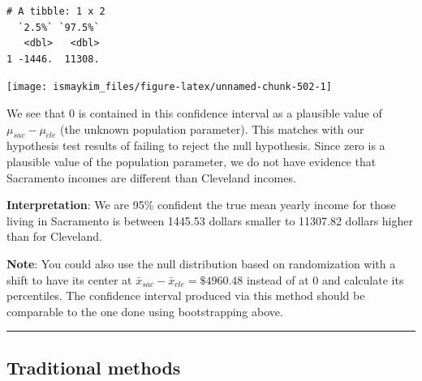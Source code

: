 \documentclass[12pt,]{krantz}
\makeatletter
\newenvironment{Shaded}{\begin{snugshade}}{\end{snugshade}}
\newcommand{\KeywordTok}[1]{\textcolor[rgb]{0.27,0.27,0.27}{\textbf{#1}}}
\newcommand{\DataTypeTok}[1]{\textcolor[rgb]{0.27,0.27,0.27}{#1}}
\newcommand{\StringTok}[1]{\textcolor[rgb]{0.5,0.5,0.5}{#1}}
\newcommand{\OperatorTok}[1]{\textcolor[rgb]{0.43,0.43,0.43}{\textbf{#1}}}
\newcommand{\NormalTok}[1]{#1}
\newenvironment{kframe}{%
\medskip{}
\setlength{\fboxsep}{.8em}
 \def\at@end@of@kframe{}%
 \ifinner\ifhmode%
  \def\at@end@of@kframe{\end{minipage}}%
  \begin{minipage}{\columnwidth}%
 \fi\fi%
 \def\FrameCommand##1{\hskip\@totalleftmargin \hskip-\fboxsep
 \colorbox{shadecolor}{##1}\hskip-\fboxsep
     \hskip-\linewidth \hskip-\@totalleftmargin \hskip\columnwidth}%
 \MakeFramed {\advance\hsize-\width
   \@totalleftmargin\z@ \linewidth\hsize
   \@setminipage}}%
 {\par\unskip\endMakeFramed%
 \at@end@of@kframe}
\renewenvironment{Shaded}{\begin{kframe}}{\end{kframe}}
\theoremstyle{definition}
\theoremstyle{definition}
\theoremstyle{definition}
\theoremstyle{remark}
\makeatother
\begin{document}
\begin{Shaded}
\end{Shaded}

\begin{verbatim}
# A tibble: 1 x 2
  `2.5%` `97.5%`
   <dbl>   <dbl>
1 -1446.  11308.
\end{verbatim}

\begin{Shaded}
\end{Shaded}

\begin{center}\texttt{[image: ismaykim\_files/figure-latex/unnamed-chunk-502-1]} \end{center}

We see that 0 is contained in this confidence interval as a plausible
value of \(\mu_{sac} - \mu_{cle}\) (the unknown population parameter).
This matches with our hypothesis test results of failing to reject the
null hypothesis. Since zero is a plausible value of the population
parameter, we do not have evidence that Sacramento incomes are different
than Cleveland incomes.

\textbf{Interpretation}: We are 95\% confident the true mean yearly
income for those living in Sacramento is between 1445.53 dollars smaller
to 11307.82 dollars higher than for Cleveland.

\textbf{Note}: You could also use the null distribution based on
randomization with a shift to have its center at
\(\bar{x}_{sac} - \bar{x}_{cle} = \$4960.48\) instead of at 0 and
calculate its percentiles. The confidence interval produced via this
method should be comparable to the one done using bootstrapping above.

\begin{center}\rule{0.5\linewidth}{\linethickness}\end{center}

\subsection{Traditional methods}\label{traditional-methods-3}
\end{document}
